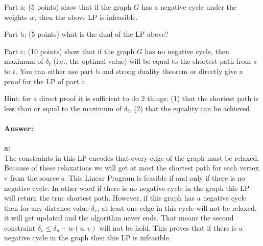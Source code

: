 Part a: (5 points) show that if the graph $G$ has a negative cycle under the weights $w$, then the above LP is infeasible.

Part b: (5 points) what is the dual of the LP above?

Part c: (10 points) show that if the graph $G$ has no negative cycle, then maximum of $\delta_t$ (i.e., the optimal value) will be equal to the shortest path from $s$ to $t$. You can either use part b and strong duality theorem or directly give a proof for the LP of part a.

Hint: for a direct proof it is sufficient to do 2 things:
(1) that the shortest path is less than or equal to the maximum of $\delta_t$, (2)  that the equality can be achieved.



\paragraph{Answer:}
\textbf{a:}\\
The constraints in this LP encodes that every edge of the graph must be relaxed. Because of these relaxations we will get at most the shortest path for each vertex v from the source s. This Linear Program is feasible if and only if there is no negative cycle. In other word if there is no negative cycle in the graph this LP will return the true shortest path. However, if this graph has a negative cycle then for any distance value $\delta_v$, at least one edge in this cycle will not be relaxed, it will get updated and the algorithm never ends. That means the second constraint  $\delta_v \leq \delta_u + w(u,v)$ will not be hold. This proves that if there is a negative cycle in the graph then this LP is infeasible. \\

